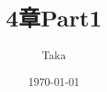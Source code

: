 \documentclass[platex,dvipdfmx]{jlreq}			%
\title{4章Part1}
\author{Taka}
\date{\today}
\begin{document}
\maketitle

\section*{}
\end{document}
